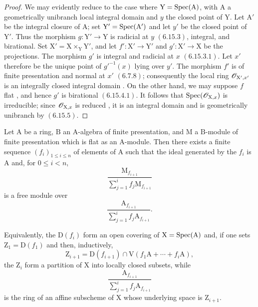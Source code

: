 \begin{proof}
We may evidently reduce to the case where $\mathrm{Y}=\operatorname{Spec}(\mathrm{A})$, with $\mathrm{A}$ a geometrically unibranch local integral domain and $y$ the closed point of $\mathrm{Y}$. Let $\mathrm{A}'$ be the integral closure of $\mathrm{A}$; set $\mathrm{Y}'=\operatorname{Spec}(\mathrm{A}')$ and let $y'$ be the closed point of $\mathrm{Y}'$. Thus the morphism $g:\mathrm{Y}'\to\mathrm{Y}$ is radicial at $y$ $(6.15.3)$, integral, and birational. Set $\mathrm{X}'=\mathrm{X}\times_\mathrm{Y}\mathrm{Y}'$, and let $f':\mathrm{X}'\to\mathrm{Y}'$ and $g':\mathrm{X}'\to\mathrm{X}$ be the projections. The morphism $g'$ is integral and radicial at $x$ $(6.15.3.1)$. Let $x'$ therefore be the unique point of $g'^{-1}(x)$ lying over $y'$. The morphism $f'$ is of finite presentation and normal at $x'$ $(6.7.8)$; consequently the local ring $\mathscr{O}_{\mathrm{X}',x'}$ is an integrally closed integral domain . On the other hand, we may suppose $f$ flat , and hence $g'$ is birational $(6.15.4.1)$. It follows that $\operatorname{Spec}(\mathscr{O}_{\mathrm{X},x})$ is irreducible; since $\mathscr{O}_{\mathrm{X},x}$ is reduced , it is an integral domain and is geometrically unibranch by $(6.15.5)$.
\end{proof}

\begin{proposition}[11.3.15]
\label{IV.11.3.15}
Let $\mathrm{A}$ be a ring, $\mathrm{B}$ an $\mathrm{A}$-algebra of finite presentation, and $\mathrm{M}$ a $\mathrm{B}$-module of finite presentation which is flat as an $\mathrm{A}$-module. Then there exists a finite sequence $(f_i)_{1\leqslant i\leqslant n}$ of elements of $\mathrm{A}$ such that the ideal generated by the $f_i$ is $\mathrm{A}$ and, for $0\leqslant i<n$,
\[
  \frac{\mathrm{M}_{f_{i+1}}}
       {\sum_{j=1}^{i}f_j\mathrm{M}_{f_{i+1}}}
\]
is a free module over
\[
  \frac{\mathrm{A}_{f_{i+1}}}
       {\sum_{j=1}^{i}f_j\mathrm{A}_{f_{i+1}}}.
\]
\end{proposition}

Equivalently, the $\mathrm{D}(f_i)$ form an open covering of $\mathrm{X}=\operatorname{Spec}(\mathrm{A})$ and, if one sets $\mathrm{Z}_1=\mathrm{D}(f_1)$ and then, inductively,
\[
  \mathrm{Z}_{i+1}
  =\mathrm{D}(f_{i+1})
   \cap\mathrm{V}(f_1\mathrm{A}+\cdots+f_i\mathrm{A}),
\]
the $\mathrm{Z}_i$ form a partition of $\mathrm{X}$ into locally closed subsets, while
\[
  \frac{\mathrm{A}_{f_{i+1}}}
       {\sum_{j=1}^{i}f_j\mathrm{A}_{f_{i+1}}}
\]
is the ring of an affine subscheme of $\mathrm{X}$ whose underlying space is $\mathrm{Z}_{i+1}$.

